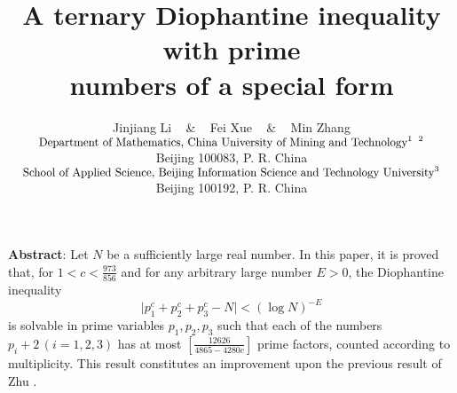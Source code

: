 \documentclass[a4paper,oneside,11pt]{article}%
\numberwithin{equation}{section}
\begin{document}
\title{A ternary Diophantine inequality with prime \\ numbers of a special form}



\author{Jinjiang Li\footnotemark[1] \,\,\,\,\,  \& \,\,\, Fei Xue\footnotemark[2]\,\,\,\,\,  \& \,\,\,
        Min Zhang\footnotemark[3]
                    \vspace*{-4mm} \\
     $\textrm{\small Department of Mathematics, China University of Mining and Technology\footnotemark[1]
                     \,\footnotemark[2]}$
                    \vspace*{-4mm} \\
     \small  Beijing 100083, P. R. China
                     \vspace*{-4mm}  \\
     $\textrm{\small School of Applied Science, Beijing Information Science and Technology University\footnotemark[3]}$
                    \vspace*{-4mm}  \\
     \small  Beijing 100192, P. R. China }





\date{}
\maketitle






{\textbf{Abstract}}: Let $N$ be a sufficiently large real number. In this paper, it is proved that, for $1<c<\frac{973}{856}$ and for any arbitrary large number $E>0$, the Diophantine inequality
\begin{equation*}
   \big|p_1^c+p_2^c+p_3^c-N\big|<(\log N)^{-E}
\end{equation*}
is solvable in prime variables $p_1,p_2,p_3$ such that each of the numbers $p_i+2\,(i=1,2,3)$ has at most
$[\frac{12626}{4865-4280c}]$ prime factors, counted according to multiplicity. This result constitutes an improvement upon
the previous result of Zhu \cite{Zhu-2020}.
\end{document}
